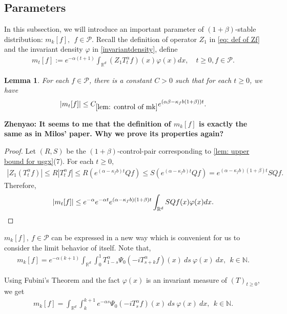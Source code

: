\documentclass[12pt,oneside,english]{amsart}
\theoremstyle{plain}
\newtheorem{lem}[thm]{Lemma}
\theoremstyle{definition}
\numberwithin{equation}{section}
\newcommand{\added}[1]{{\color{blue}#1}}\newcommand{\deleted}[1]{{\color{red}#1}}
\begin{document}
\subsection{Parameters}
\deleted{ In this subsection, we will introduce an important parameter of $(1+\beta)$-stable distribution: $m_k[f],~~f\in \mathcal{P}$.}
\added{ 
 Recall the definition of operator $Z_1$ in \eqref{eq: def of Zf} and the invariant density $\varphi$ in \eqref{invariantdensity}, define 
 \begin{align}\label{parameter_mk}
      m_t[f]:=e^{-\alpha (t+1)}\int_{\mathbb R^d} (Z_1T_t^{\alpha}f)(x)\varphi(x)dx,\quad t\geq 0, f\in \mathcal P.
 \end{align}
 }
\added{
\begin{lem}\label{lem: control of mk}
For each $f\in\mathcal{P}$, there is a constant $C>0$ such that for each $t\geq 0$, we have
$$|m_t[f]|\leq C_{\ref{lem: control of mk}} e^{(\alpha\beta-\kappa_fb(1+\beta))t}.$$
\end{lem}
}
{\bf Zhenyao: It seems to me that the definition of $m_k[f]$ is exactly the same as in Milos' paper. Why we prove its properties again?}
\begin{proof}
\added{
	Let $(R,S)$ be the $(1+\beta)$-control-pair corresponding to \ref{lem: upper bound for usgx}(7). 
	For each $t\geq 0$,
\begin{align}
    |Z_1(T^{\alpha}_t f)|
    \leq R|T^{\alpha}_tf|
    \leq R (e^{(\alpha-\kappa_fb)t}Qf)
    \leq S(e^{(\alpha-\kappa_fb)t}Qf)
    =e^{(\alpha-\kappa_fb)(1+\beta)t}SQf.
    \end{align}
Therefore,
\[
	|m_t[f]|\leq e^{-\alpha}e^{-\alpha t}e^{(\alpha-\kappa_fb)(1+\beta)t}\int_{\mathbb R^d}SQf(x)\varphi(x)dx.
	\qedhere
\]
}
\end{proof}

$m_k[f],~f\in \mathcal{P}$ can be expressed in a new way which is convenient for us to consider the limit behavior of itself. Note that,
\begin{align}
    m_k[f]=e^{-\alpha(k+1)}\int_{\mathbb{R}^d}\int_0^1 T_{1-s}^{\alpha}\Psi_0(-iT_{s+k}^{\alpha}f)(x)~ds~\varphi(x)~dx,~~k\in\mathbb{N}.
\end{align}

Using Fubini's Theorem and the fact $\varphi(x)$ is an invariant measure of $(T)_{t\geq 0}$, we get
\begin{align}
    m_k[f]=\int_{\mathbb{R}^d}\int_k^{k+1} e^{-\alpha s}\Psi_0(-iT_{s}^{\alpha}f)(x)~ds~\varphi(x)~dx,~~k\in \mathbb{N}.\label{mkeq}
\end{align}
\end{document}

